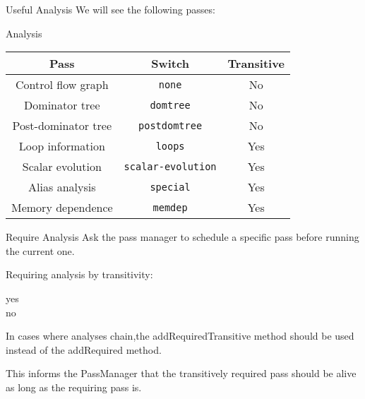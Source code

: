 \begin{frame}{Useful Analysis}
We will see the following passes:

\begin{block}{Analysis}
\centering
\begin{tabular}{ccc}
\toprule

\multicolumn{1}{c}{\textbf{Pass}}        &
\multicolumn{1}{c}{\textbf{Switch}}      &
\multicolumn{1}{c}{\textbf{Transitive}} \\

\midrule

Control flow graph  &
\texttt{none}       &
No                 \\

Dominator tree    &
\texttt{domtree}  &
No               \\

Post-dominator tree   &
\texttt{postdomtree}  &
No                   \\

Loop information  &
\texttt{loops}    &
Yes              \\

Scalar evolution           &
\texttt{scalar-evolution}  &
Yes                       \\

Alias analysis    &
\texttt{special}  &
Yes              \\

Memory dependence  &
\texttt{memdep}    &
Yes               \\

\bottomrule
\end{tabular}
\end{block}
\end{frame}

\begin{frame}{Require Analysis}
Ask the pass manager to schedule a specific pass
before running the current one.

\vfill
Requiring analysis by transitivity:
\begin{description}
\item[yes] 
\item[no] 
\end{description}

\vfill
In cases where \alert{analyses chain},the addRequiredTransitive method
should be used instead of the addRequired method.

This informs the PassManager that the transitively required pass
should be alive as long as the requiring pass is.
\end{frame}

